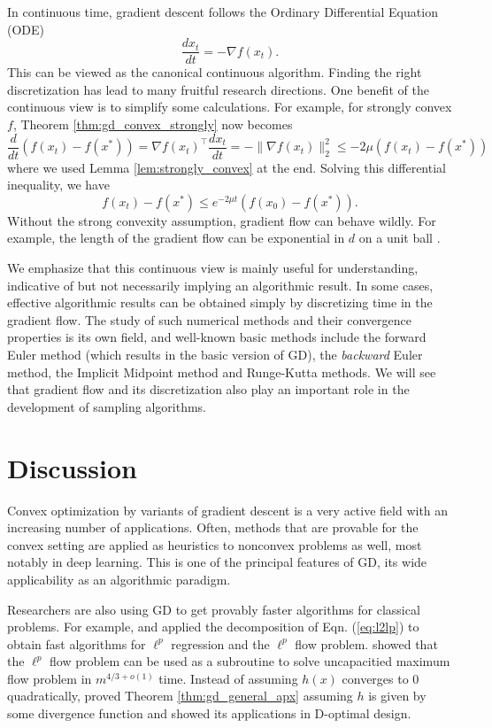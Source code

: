 In continuous time, gradient descent follows the Ordinary Differential
Equation (ODE) 
\[
\frac{dx_{t}}{dt}=-\nabla f(x_{t}).
\]
This can be viewed as the canonical continuous algorithm. Finding
the right discretization has lead to many fruitful research directions.
One benefit of the continuous view is to simplify some calculations.
For example, for strongly convex $f$, Theorem \ref{thm:gd_convex_strongly}
now becomes
\[
\frac{d}{dt}(f(x_{t})-f(x^{*}))=\nabla f(x_{t})^{\top}\frac{dx_{t}}{dt}=-\|\nabla f(x_{t})\|_{2}^{2}\leq-2\mu\left(f(x_{t})-f(x^{*})\right)
\]
where we used Lemma \ref{lem:strongly_convex} at the end. Solving
this differential inequality, we have
\[
f(x_{t})-f(x^{*})\leq e^{-2\mu t}(f(x_{0})-f(x^{*})).
\]
Without the strong convexity assumption, gradient flow can behave
wildly. For example, the length of the gradient flow can be exponential
in $d$ on a unit ball \cite{manselli1991maximum}. 

We emphasize that this continuous view is mainly useful for understanding,
indicative of but not necessarily implying an algorithmic result.
In some cases, effective algorithmic results can be obtained simply
by discretizing time in the gradient flow. The study of such numerical
methods and their convergence properties is its own field, and well-known
basic methods include the forward Euler method (which results in the
basic version of GD), the \emph{backward }Euler method, the Implicit
Midpoint method and Runge-Kutta methods. We will see that gradient
flow and its discretization also play an important role in the development
of sampling algorithms.

\section{Discussion}

Convex optimization by variants of gradient descent is a very active
field with an increasing number of applications. Often, methods that
are provable for the convex setting are applied as heuristics to nonconvex
problems as well, most notably in deep learning. This is one of the
principal features of GD, its wide applicability as an algorithmic
paradigm. 

Researchers are also using GD to get provably faster algorithms for
classical problems. For example, \cite{adil2019iterative} and \cite{kyng2019flows}
applied the decomposition of Eqn. (\ref{eq:l2lp}) to obtain fast
algorithms for $\ell^{p}$ regression and the $\ell^{p}$ flow problem.
\cite{kathuria2020unit} showed that the $\ell^{p}$ flow problem
can be used as a subroutine to solve uncapacitied maximum flow problem
in $m^{4/3+o(1)}$ time. Instead of assuming $h(x)$ converges to
$0$ quadratically, \cite{lu2016relatively} proved Theorem \ref{thm:gd_general_apx}
assuming $h$ is given by some divergence function and showed its
applications in D-optimal design.
